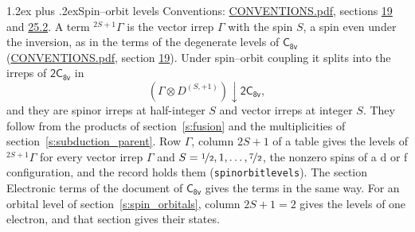 \documentclass[10pt,a4paper]{article}
\makeatletter
\renewcommand\section{\@startsection{section}{1}{\z@}{-3ex plus -1ex minus -.2ex}%
  {1.2ex plus .2ex}{\normalfont\large\sffamily\bfseries\color{parttitle}}}
\numberwithin{equation}{section}
\newcommand{\grp}[1]{\mathsf{#1}}
\newcommand{\restr}[2]{#1\!\downarrow#2}
\newcommand{\irrJp}[2]{D^{(#1,#2)}}
\newcommand{\irrprod}{\otimes}
\newcommand{\term}[2]{{}^{#1}#2}
\makeatother
\begin{document}
\section{Spin--orbit levels}\label{s:spin_orbit}
Conventions: \href{../../CONVENTIONS.pdf}{CONVENTIONS.pdf}, sections \href{../../../rotation/CONVENTIONS.pdf\#conv.19}{19} and \href{../../CONVENTIONS.pdf\#conv.25.2}{25.2}.
\leavevmode\label{n:local.spin}\label{n:symbol.term}A term $\term{2S+1}{\Gamma}$ is the vector irrep $\Gamma$ with the spin $S$, a spin even under the inversion, as in the terms of the degenerate levels of \href{../../../rotation/data/pdf/C8v.pdf}{$\grp{C_{8v}}$} (\href{../../CONVENTIONS.pdf}{CONVENTIONS.pdf}, section \href{../../../rotation/CONVENTIONS.pdf\#conv.19}{19}). Under spin--orbit coupling it splits into the irreps of $\grp{2C_{8v}}$ in
\begin{equation}\label{e:spinorbit}\restr{(\Gamma \irrprod \irrJp{S}{+1})}{\grp{2C_{8v}}},\end{equation}
and they are spinor irreps at half-integer $S$ and vector irreps at integer $S$. They follow from the products of section~\ref{s:fusion} and the multiplicities of section~\ref{s:subduction_parent}. Row $\Gamma$, column $2S + 1$ of a table gives the levels of $\term{2S+1}{\Gamma}$ for every vector irrep $\Gamma$ and $S = \nicefrac{1}{2}, 1, \dots, \nicefrac{7}{2}$, the nonzero spins of a d or f configuration, and the record holds them (\texttt{spinorbitlevels}). The section Electronic terms of the document of \href{../../../rotation/data/pdf/C8v.pdf}{$\grp{C_{8v}}$} gives the terms in the same way. For an orbital level of section~\ref{s:spin_orbitals}, column $2S + 1 = 2$ gives the levels of one electron, and that section gives their states.
\end{document}
